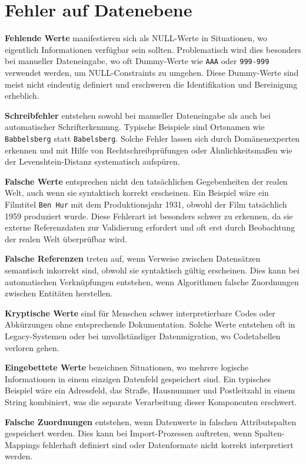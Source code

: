 \documentclass[
    a4paper,
    12pt,
    headinclude=true,
    BCOR=10mm,
]{scrreprt}
\begin{document}
\section{Fehler auf Datenebene}

\textbf{Fehlende Werte} manifestieren sich als NULL-Werte in Situationen, wo eigentlich Informationen verfügbar sein sollten. Problematisch wird dies besonders bei manueller Dateneingabe, wo oft Dummy-Werte wie \texttt{AAA} oder \texttt{999-999} verwendet werden, um NULL-Constraints zu umgehen. Diese Dummy-Werte sind meist nicht eindeutig definiert und erschweren die Identifikation und Bereinigung erheblich.

\textbf{Schreibfehler} entstehen sowohl bei manueller Dateneingabe als auch bei automatischer Schrifterkennung. Typische Beispiele sind Ortsnamen wie \texttt{Babbelsberg} statt \texttt{Babelsberg}. Solche Fehler lassen sich durch Domänenexperten erkennen und mit Hilfe von Rechtschreibprüfungen oder Ähnlichkeitsmaßen wie der Levenshtein-Distanz systematisch aufspüren.

\textbf{Falsche Werte} entsprechen nicht den tatsächlichen Gegebenheiten der realen Welt, auch wenn sie syntaktisch korrekt erscheinen. Ein Beispiel wäre ein Filmtitel \texttt{Ben Hur} mit dem Produktionsjahr 1931, obwohl der Film tatsächlich 1959 produziert wurde. Diese Fehlerart ist besonders schwer zu erkennen, da sie externe Referenzdaten zur Validierung erfordert und oft erst durch Beobachtung der realen Welt überprüfbar wird.

\textbf{Falsche Referenzen} treten auf, wenn Verweise zwischen Datensätzen semantisch inkorrekt sind, obwohl sie syntaktisch gültig erscheinen. Dies kann bei automatischen Verknüpfungen entstehen, wenn Algorithmen falsche Zuordnungen zwischen Entitäten herstellen.

\textbf{Kryptische Werte} sind für Menschen schwer interpretierbare Codes oder Abkürzungen ohne entsprechende Dokumentation. Solche Werte entstehen oft in Legacy-Systemen oder bei unvollständiger Datenmigration, wo Codetabellen verloren gehen.

\textbf{Eingebettete Werte} bezeichnen Situationen, wo mehrere logische Informationen in einem einzigen Datenfeld gespeichert sind. Ein typisches Beispiel wäre ein Adressfeld, das Straße, Hausnummer und Postleitzahl in einem String kombiniert, was die separate Verarbeitung dieser Komponenten erschwert.

\textbf{Falsche Zuordnungen} entstehen, wenn Datenwerte in falschen Attributspalten gespeichert werden. Dies kann bei Import-Prozessen auftreten, wenn Spalten-Mappings fehlerhaft definiert sind oder Datenformate nicht korrekt interpretiert werden.
\end{document}
